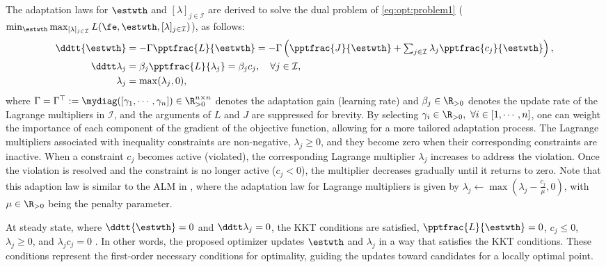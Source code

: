 \documentclass[final,5p,times,twocolumn,authoryear]{elsarticle}
\begin{document}
The adaptation laws for $\estwth$ and $[\lambda]_{j\in\mathcal I}$ are derived to solve the dual problem of \eqref{eq:opt:problem1} (\ie  $\min_{\estwth} \max_{[\lambda]_{j\in\mathcal I}}L(\fe,\estwth,[\lambda]_{j\in\mathcal I})$), as follows:
\begin{subequations}
    \begin{align}
            \ddtt{\estwth}
            &
            =
            -\Gamma \pptfrac{L}{\estwth}
            =
            -\Gamma 
            \left(
                \pptfrac{J}{\estwth}
                +
                \textstyle\sum_{j\in\mathcal{I}}
                \lambda_j 
                \pptfrac{c_j}{\estwth}
            \right),
        \label{eq:adap:th}
            \\
            \ddtt\lambda_j
            & 
            = 
            \beta_j\pptfrac{L}{\lambda_j} 
            = 
            \beta_j c_j ,
            \quad \forall j\in\mathcal I,
        \label{eq:adap:lbd}
            \\
            \lambda_j & = \max(\lambda_j,0) ,
        \label{eq:adap:lbd:max}
    \end{align}
    \label{eq:adaptation law}
\end{subequations}
where $\Gamma=\Gamma^\top:=\mydiag([\gamma_1,\cdots,\gamma_n])\in\R^{n\times n}_{>0}$ denotes the adaptation gain (learning rate) and $\beta_j\in\R_{>0}$ denotes the update rate of the Lagrange multipliers in $\mathcal I$, and the arguments of $L$ and $J$ are suppressed for brevity. 
By selecting $\gamma_i\in\R_{>0},\ \forall i\in[1,\cdots,n]$, one can weight the importance of each component of the gradient of the objective function, allowing for a more tailored adaptation process.
The Lagrange multipliers associated with inequality constraints are non-negative, \ie $\lambda_j\ge 0$, and they become zero when their corresponding constraints are inactive. When a constraint $c_j$ becomes active (\ie violated), the corresponding Lagrange multiplier $\lambda_j$ increases to address the violation. Once the violation is resolved and the constraint is no longer active (\ie $c_j < 0$), the multiplier decreases gradually until it returns to zero. Note that this adaption law is similar to the ALM in \cite{Nocedal:2006aa}, where the adaptation law for Lagrange multipliers is given by $\lambda_j\leftarrow \max(\lambda_j-\tfrac{c_j}{\mu},0)$, with $\mu\in\R_{>0}$ being the penalty parameter. 

At steady state, where $\ddtt{\estwth}=0$ and $\ddtt\lambda_j=0$, the KKT conditions are satisfied, \ie $\pptfrac{L}{\estwth}=0$, $c_j \le 0$, $\lambda_j \ge 0$, and $\lambda_j c_j=0$ \cite[Chap.~12 T.~12.1]{Nocedal:2006aa}.
In other words, the proposed optimizer updates $\estwth$ and $\lambda_j$ in a way that satisfies the KKT conditions. 
These conditions represent the first-order necessary conditions for optimality, guiding the updates toward candidates for a locally optimal point.
\end{document}
